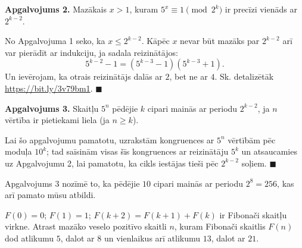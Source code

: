\documentclass[a4paper,12pt]{article}
\newcommand\answer[1]{}
\begin{document}
\begin{problem}
{\vspace{10pt}
{\bf Apgalvojums 2.} Mazākais $x>1$, kuram $5^x \equiv 1 \pmod{2^k}$ ir precīzi 
vienāds ar $2^{k-2}$. 

\vspace{5pt} 
No Apgalvojuma 1 seko, ka $x \leq 2^{k-2}$. 
Kāpēc $x$ nevar būt mazāks par $2^{k-2}$ arī var pierādīt ar indukciju, ja sadala reizinātājos: 
\[ 5^{k-2} - 1 = \left( 5^{k-3} - 1 \right)\left( 5^{k-3} + 1 \right). \]
Un ievērojam, ka otrais reizinātājs dalās ar $2$, bet ne ar $4$. 
Sk. detalizētāk \url{https://bit.ly/3v79bm1}.  $\blacksquare$


\vspace{10pt}
{\bf Apgalvojums 3.} Skaitļu $5^n$ pēdējie $k$ cipari mainās ar periodu $2^{k-2}$, ja
$n$ vērtība ir pietiekami liela (ja $n \geq k$). 

\vspace{5pt} 
Lai šo apgalvojumu pamatotu, uzrakstām kongruences ar $5^n$ vērtībām pēc moduļa $10^k$; 
tad saīsinām visas šīs kongruences ar reizinātāju $5^k$ un atsaucamies uz Apgalvojumu 2, 
lai pamatotu, ka cikls iestājas tieši pēc $2^{k-2}$ soļiem. $\blacksquare$

Apgalvojums 3 nozīmē to, ka pēdējie $10$ cipari mainās ar periodu $2^8 = 256$, kas arī 
pamato mūsu atbildi. 
}
\end{problem}



\vspace{20pt}
\begin{problem}
$F(0)=0$; $F(1)=1$; $F(k+2) = F(k+1) + F(k)$ ir Fibonači skaitļu virkne.
Atrast mazāko veselo pozitīvo skaitli $n$, kuram Fibonači skaitlis $F(n)$ dod atlikumu $5$, 
dalot ar $8$ un vienlaikus arī atlikumu $13$, dalot ar $21$. 
\answer{

{\bf Atbilde.} $\mathtt{7}$\\
Varam atrast, ka $F(7) = 13$, kas dod abus vajadzīgos atlikumus. 

Šīm konkrētajām vērtībām bija visai viegli uzminēt atrisinājumu kongruenču sistēmai. 
Var viegli formulēt arī drusku sarežģītākus piemērus. Piemēram, atrast mazāko $n$, kuram $F(n)$ apmierina kongruences:
\[ \left\{ \begin{array}{l}
F(n) \equiv 0 \pmod{10}\\
F(n) \equiv 0 \pmod{13}\\
\end{array} \right. \]
Var pamatot, ka ar $10$ dalās visi tie $F(n)$, kuriem $n$ dalās ar $15$, bet ar $13$ dalās visi tie $F(n)$, kuriem 
$n$ dalās ar $7$. Tāpēc mazākais pozitīvais $n$, kuram $F(n)$ dalās ar $130$ būs $15 \cdot 7 = 105$. 
}
\end{problem}
\end{document}
